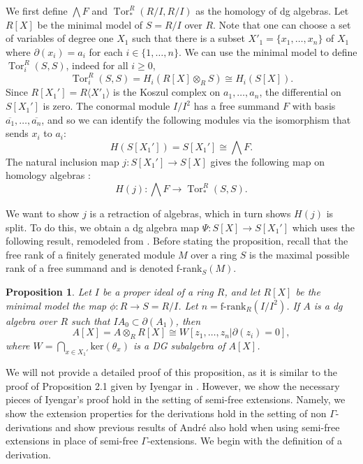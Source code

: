 \documentclass{amsart}
\newtheorem{prop}[theorem]{Proposition}
\theoremstyle{definition}
\theoremstyle{remark}
\newcommand{\Tor}{\ensuremath{\operatorname{Tor}}}
\begin{document}
We first define $\bigwedge F$ and $\Tor_{*}^{R}(R/I,R/I)$ as the homology of dg algebras. 
Let $R[ X ]$ be the minimal model of $S=R/I$ over $R$. Note that one can choose a set of variables of degree one $X_1$ such that there is a subset $X'_1=\{x_1,\ldots, x_n\}$ of $X_1$ where $\partial(x_i)=a_i$ for each $i \in \{1, \ldots, n
\}$. We can use the minimal model to define $\Tor_{i}^{R}(S,S)$, indeed for all $i \geq 0$,
\[
\Tor_{i}^{R}(S,S) 
= H_i(R[ X ]\otimes_{R} S)
\cong H_i(S[ X ]).
\]
 Since $R[ X_1' ] = R\langle X'_1\rangle$ is the Koszul complex on $a_1,\ldots,a_n$, the differential on $S[ X_1' ]$ is zero. The conormal module $I/I^2$ has a free summand $F$ with basis $\overline{a_1}, \ldots, \overline{a_n}$, and so we can identify the following modules via the isomorphism that sends $x_i$ to $a_i$:
\[
H(S[ X_1' ] )
= S[ X_1' ]
\cong \bigwedge F.
\]
The natural inclusion map $j: S[X_1'] \to S[ X ]$ gives the following map on homology algebras :
\[
H(j) \colon  \bigwedge F \to \Tor^{R}_{*}(S,S).
\]

We want to show $j$ is a retraction of algebras, which in turn shows $H(j)$ is split. To do this, we obtain a dg algebra map $\Psi \colon S[ X] \to S[ X_1' ]$ which uses the following result, remodeled from \cite{Iyengar2001}. Before stating the proposition, recall that the free rank of a finitely generated module $M$ over a ring $S$ is the maximal possible rank of a free summand and is denoted f-rank$_{S}(M)$.


\begin{prop}
\label{prop-minimal}
    Let $I$ be a proper ideal of a ring $R$, and let $R[X]$ be the minimal model the map $\phi: R\to S=R/I$. Let $n = \text{f-rank}_R(I/I^2)$. If $A$ is a dg algebra over $R$ such that $IA_0\subset \partial(A_1)$, then $$A[ X ] = A \otimes_{R} R[ X ] \cong W[ z_1, \ldots, z_n | \partial(z_i)=0],$$
    where $W =  \bigcap_{x \in X_1'}\text{ker} \left(\theta_x\right)$ is a DG subalgebra of $A[ X ]$.
\end{prop}

We will not provide a detailed proof of this proposition, as it is similar to the proof of Proposition 2.1 given by Iyengar in \cite{Iyengar2001}. However, we show the necessary pieces of Iyengar's proof hold in the setting of semi-free extensions. Namely, we show the extension properties for the derivations hold in the setting of non $\Gamma$-derivations and show previous results of André also hold when using semi-free extensions in place of semi-free $\Gamma$-extensions. We begin with the definition of a derivation.
\end{document}
